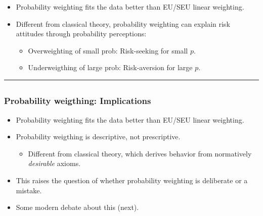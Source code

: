 \documentclass[
  letterpaper,
  DIV=11,
  numbers=noendperiod]{scrartcl}
\providecommand{\tightlist}{%
  \setlength{\itemsep}{0pt}\setlength{\parskip}{0pt}}\usepackage{longtable,booktabs,array}
\begin{document}
\begin{itemize}
\tightlist
\item
  Probability weighting fits the data better than EU/SEU linear
  weighting.
\item
  Different from classical theory, probability weighting can explain
  risk attitudes through probability perceptions:

  \begin{itemize}
  \tightlist
  \item
    Overweighting of small prob: Risk-seeking for small \(p\).
  \item
    Underweigthing of large prob: Risk-aversion for large \(p\).
  \end{itemize}
\end{itemize}

\begin{center}\rule{0.5\linewidth}{0.5pt}\end{center}

\subsection{}\label{section-1}

\subsubsection{Probability weigthing:
Implications}\label{probability-weigthing-implications-1}

\begin{itemize}
\tightlist
\item
  Probability weighting fits the data better than EU/SEU linear
  weighting.
\item
  Probability weigthing is {descriptive}, not {prescriptive}.

  \begin{itemize}
  \tightlist
  \item
    Different from classical theory, which derives behavior from
    normatively \emph{desirable} axioms.
  \end{itemize}
\end{itemize}

\begin{itemize}
\tightlist
\item
  This raises the question of whether probability weighting is
  deliberate or a mistake.
\item
  Some modern debate about this (next).
\end{itemize}
\end{document}
